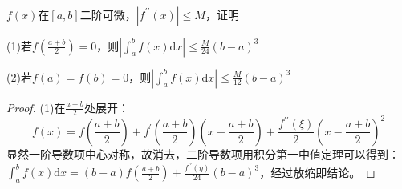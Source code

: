 ~

\begin{exercise}[利用二阶导数研究积分]
  $f(x)$在$[a,b]$二阶可微，$|f^{\prime\prime}(x)| \leq M$，证明

  (1)若$f \left( \frac{a+b}{2} \right) = 0$，则$\left| \int_a^b f(x)\mathrm{d} x \right| \leq \frac{M}{24}(b-a)^3$

  (2)若$f(a) = f(b) = 0$，则$\left| \int_a^b f(x)\mathrm{d} x \right| \leq \frac{M}{12}(b-a)^3$
\end{exercise}

\begin{proof}
  (1)在$\frac{a+b}{2}$处展开：
  \begin{equation*}
    f(x) = f \left( \frac{a+b}{2} \right) + f^{\prime}\left( \frac{a+b}{2} \right) \left( x - \frac{a+b}{2} \right) + \frac{f^{\prime\prime}(\xi)}{2} \left( x - \frac{a+b}{2} \right)^2
  \end{equation*}
  显然一阶导数项中心对称，故消去，二阶导数项用积分第一中值定理可以得到：
  $\int _a^b f(x)\mathrm{d} x = (b - a)f \left( \frac{a+b}{2} \right) + \frac{f^{\prime\prime}(\eta)}{24}(b-a)^3$，经过放缩即结论。
\end{proof}








